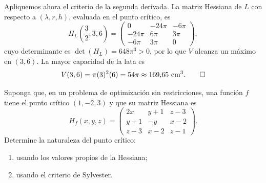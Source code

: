 \documentclass[11pt,respuestas,a4]{aleph-examen}
\begin{document}
\begin{preguntas}
\begin{respuesta}
Apliquemos ahora el criterio de la segunda derivada. La matriz Hessiana de $L$ con respecto a $(\lambda,r,h)$, evaluada en el punto crítico, es
\[
    H_L\!\left(\frac{3}{2},3,6\right)
    =
    \begin{pmatrix}
        0 & -24\pi & -6\pi\\[4pt]
        -24\pi & 6\pi & 3\pi\\[4pt]
        -6\pi & 3\pi & 0
    \end{pmatrix},
\]
cuyo determinante es $\det(H_L) = 648\pi^3 > 0$, por lo que $V$ alcanza un {máximo} en $(3,6)$. La mayor capacidad de la lata es
\[
    V(3,6) = \pi (3)^2 (6) = 54\pi \approx 169{,}65\ \text{cm}^3.\qedhere
\]
\end{respuesta}


\item
Suponga que, en un problema de optimización sin restricciones, una función $f$ tiene el punto crítico $(1,-2,3)$ y que su matriz Hessiana es
\[
    H_f(x,y,z)
    =
    \begin{pmatrix}
        2x & y+1 & z-3\\
        y+1 & -y & x-2\\
        z-3 & x-2 & z-1
    \end{pmatrix}.
\]
Determine la naturaleza del punto crítico:
\begin{enumerate}[leftmargin=*]
    \item usando los valores propios de la Hessiana;
    \item usando el criterio de Sylvester.
\end{enumerate}


\end{preguntas}
\end{document}
